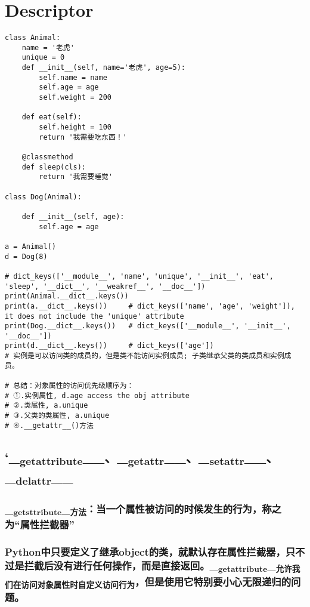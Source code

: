 \documentclass[11pt]{article}
\begin{document}
\section{Descriptor}
\label{sec:org53c578a}
\begin{verbatim}
class Animal:
    name = '老虎'
    unique = 0
    def __init__(self, name='老虎', age=5):
        self.name = name
        self.age = age
        self.weight = 200

    def eat(self):
        self.height = 100
        return '我需要吃东西！'

    @classmethod
    def sleep(cls):
        return '我需要睡觉'

class Dog(Animal):

    def __init__(self, age):
        self.age = age

a = Animal()
d = Dog(8)

# dict_keys(['__module__', 'name', 'unique', '__init__', 'eat', 'sleep', '__dict__', '__weakref__', '__doc__'])
print(Animal.__dict__.keys())
print(a.__dict__.keys())     # dict_keys(['name', 'age', 'weight']), it does not include the 'unique' attribute
print(Dog.__dict__.keys())   # dict_keys(['__module__', '__init__', '__doc__'])
print(d.__dict__.keys())     # dict_keys(['age'])
# 实例是可以访问类的成员的，但是类不能访问实例成员; 子类继承父类的类成员和实例成员。

# 总结：对象属性的访问优先级顺序为：
# ①.实例属性, d.age access the obj attribute
# ②.类属性, a.unique
# ③.父类的类属性, a.unique
# ④.__getattr__()方法
\end{verbatim}
\subsection{`\_\textsubscript{getattribute}\_\_、\_\textsubscript{getattr}\_\_、\_\textsubscript{setattr}\_\_、\_\textsubscript{delattr}\_\_}
\label{sec:org1121dea}
\subsubsection{\_\textsubscript{getsttribute}\_\textsubscript{方法}：当一个属性被访问的时候发生的行为，称之为“属性拦截器”}
\label{sec:orgc0eccff}
\subsubsection{Python中只要定义了继承object的类，就默认存在属性拦截器，只不过是拦截后没有进行任何操作，而是直接返回。\_\textsubscript{getattribute}\_\textsubscript{允许我们在访问对象属性时自定义访问行为}，但是使用它特别要小心无限递归的问题。}
\label{sec:org4ed5ac4}
\end{document}
